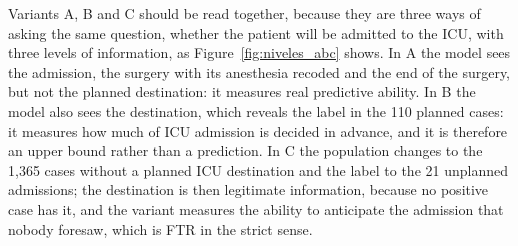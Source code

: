 Variants A, B and C should be read together, because they are three ways of asking the same question, whether the patient will be admitted to the ICU, with three levels of information, as Figure~\ref{fig:niveles_abc} shows. In A the model sees the admission, the surgery with its anesthesia recoded and the end of the surgery, but not the planned destination: it measures real predictive ability. In B the model also sees the destination, which reveals the label in the 110 planned cases: it measures how much of ICU admission is decided in advance, and it is therefore an upper bound rather than a prediction. In C the population changes to the 1,365 cases without a planned ICU destination and the label to the 21 unplanned admissions; the destination is then legitimate information, because no positive case has it, and the variant measures the ability to anticipate the admission that nobody foresaw, which is FTR in the strict sense.

